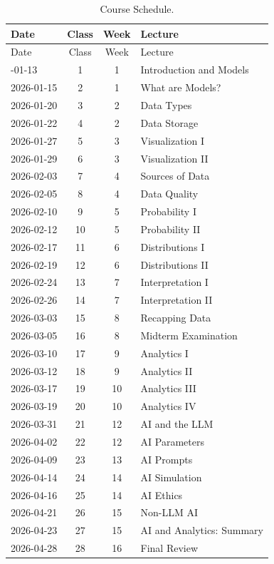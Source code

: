 \documentclass[11pt,]{article}
\begin{document}
\begin{longtable}[]{@{}lccl@{}}
\caption{Course Schedule.}\tabularnewline
\toprule\noalign{}
Date & Class & Week & Lecture \\
\midrule\noalign{}
\endfirsthead
\toprule\noalign{}
Date & Class & Week & Lecture \\
\midrule\noalign{}
\endhead
\bottomrule\noalign{}
\endlastfoot
2026-01-13 & 1 & 1 & Introduction and Models \\
2026-01-15 & 2 & 1 & What are Models? \\
2026-01-20 & 3 & 2 & Data Types \\
2026-01-22 & 4 & 2 & Data Storage \\
2026-01-27 & 5 & 3 & Visualization I \\
2026-01-29 & 6 & 3 & Visualization II \\
2026-02-03 & 7 & 4 & Sources of Data \\
2026-02-05 & 8 & 4 & Data Quality \\
2026-02-10 & 9 & 5 & Probability I \\
2026-02-12 & 10 & 5 & Probability II \\
2026-02-17 & 11 & 6 & Distributions I \\
2026-02-19 & 12 & 6 & Distributions II \\
2026-02-24 & 13 & 7 & Interpretation I \\
2026-02-26 & 14 & 7 & Interpretation II \\
2026-03-03 & 15 & 8 & Recapping Data \\
2026-03-05 & 16 & 8 & Midterm Examination \\
2026-03-10 & 17 & 9 & Analytics I \\
2026-03-12 & 18 & 9 & Analytics II \\
2026-03-17 & 19 & 10 & Analytics III \\
2026-03-19 & 20 & 10 & Analytics IV \\
2026-03-31 & 21 & 12 & AI and the LLM \\
2026-04-02 & 22 & 12 & AI Parameters \\
2026-04-09 & 23 & 13 & AI Prompts \\
2026-04-14 & 24 & 14 & AI Simulation \\
2026-04-16 & 25 & 14 & AI Ethics \\
2026-04-21 & 26 & 15 & Non-LLM AI \\
2026-04-23 & 27 & 15 & AI and Analytics: Summary \\
2026-04-28 & 28 & 16 & Final Review \\
\end{longtable}
\end{document}

